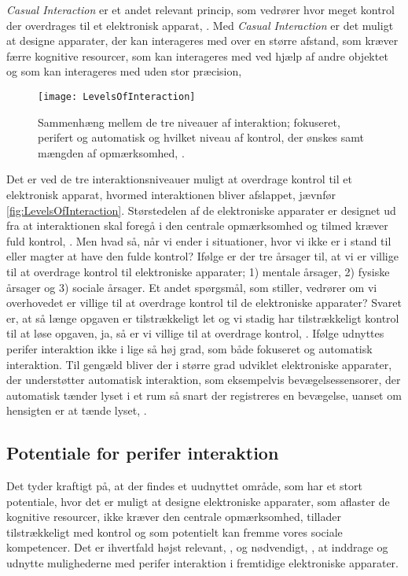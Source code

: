 \textit{Casual Interaction} er et andet relevant princip, som vedrører hvor meget kontrol der overdrages til et elektronisk apparat, \parencite[ss. 118-119]{PDF:PICasualInteractionKap6}. Med \textit{Casual Interaction} er det muligt at designe apparater, der kan interageres med over en større afstand, som kræver færre kognitive resourcer, som kan interageres med ved hjælp af andre objektet og som kan interageres med uden stor præcision, \parencite[s. 128]{PDF:PICasualInteractionKap6}        
%
\begin{figure}[H]
	\centering
	\texttt{[image: LevelsOfInteraction]}
	\caption{Sammenhæng mellem de tre niveauer af interaktion; fokuseret, perifert og automatisk og hvilket niveau af kontrol, der ønskes samt mængden af opmærksomhed, \parencite[s. 118]{PDF:PICasualInteractionKap6}.}
	\label{fig:LevelsOfInteraction}
\end{figure}
\noindent
%
Det er ved de tre interaktionsniveauer muligt at overdrage kontrol til et elektronisk apparat, hvormed interaktionen bliver afslappet, jævnfør \autoref{fig:LevelsOfInteraction}. Størstedelen af de elektroniske apparater er designet ud fra at interaktionen skal foregå i den centrale opmærksomhed og tilmed kræver fuld kontrol, \parencite[s. 118]{PDF:PICasualInteractionKap6}. Men hvad så, når vi ender i situationer, hvor vi ikke er i stand til eller magter at have den fulde kontrol? Ifølge \textcite[s. 123]{PDF:PICasualInteractionKap6} er der tre årsager til, at vi er villige til at overdrage kontrol til elektroniske apparater; 1) mentale årsager, 2) fysiske årsager og 3) sociale årsager. Et andet spørgsmål, som \textcite[s. 124]{PDF:PICasualInteractionKap6} stiller, vedrører om vi overhovedet er villige til at overdrage kontrol til de elektroniske apparater? Svaret er, at så længe opgaven er tilstrækkeligt let og vi stadig har tilstrækkeligt kontrol til at løse opgaven, ja, så er vi villige til at overdrage kontrol, \parencite[s. 124]{PDF:PICasualInteractionKap6}.\blankline
%
Ifølge \textcite[s. 6]{PDF:PIIntroduction} udnyttes perifer interaktion ikke i lige så høj grad, som både fokuseret og automatisk interaktion. Til gengæld bliver der i større grad udviklet elektroniske apparater, der understøtter automatisk interaktion, som eksempelvis bevægelsessensorer, der automatisk tænder lyset i et rum så snart der registreres en bevægelse, uanset om hensigten er at tænde lyset, \parencite[s. 5]{PDF:PIIntroduction}.
% 
\subsection{Potentiale for perifer interaktion}
\label{Potentiale}
%
Det tyder kraftigt på, at der findes et uudnyttet område, som har et stort potentiale, hvor det er muligt at designe elektroniske apparater, som aflaster de kognitive resourcer, ikke kræver den centrale opmærksomhed, tillader tilstrækkeligt med kontrol og som potentielt kan fremme vores sociale kompetencer. Det er ihvertfald højst relevant, \parencite[s. 239]{PDF:PICharacteristicsAndConsiderations}, og nødvendigt, \parencite[s. 3]{PDF:TheComingAgeOfCalmTech}, at inddrage og udnytte mulighederne med perifer interaktion i fremtidige elektroniske apparater. 

